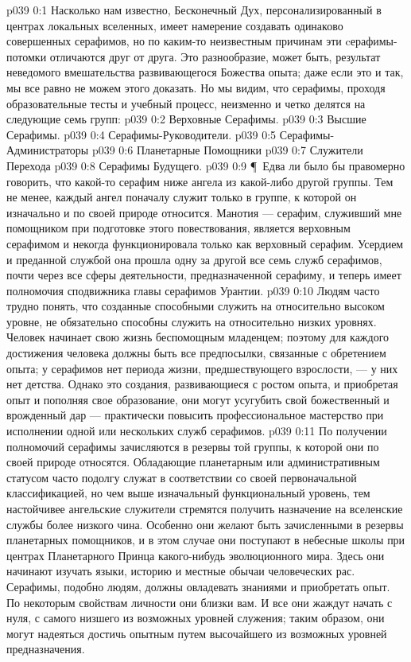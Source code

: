 \author{Мелхиседек}
\vs p039 0:1 Насколько нам известно, Бесконечный Дух, персонализированный в центрах локальных вселенных, имеет намерение создавать одинаково совершенных серафимов, но по каким\hyp{}то неизвестным причинам эти cерафимы\hyp{}потомки отличаются друг от друга. Это разнообразие, может быть, результат неведомого вмешательства развивающегося Божества опыта; даже если это и так, мы все равно не можем этого доказать. Но мы видим, что серафимы, проходя образовательные тесты и учебный процесс, неизменно и четко делятся на следующие семь групп:
\vs p039 0:2 \bibnobreakspace Верховные Серафимы.
\vs p039 0:3 \bibnobreakspace Высшие Серафимы.
\vs p039 0:4 \bibnobreakspace Серафимы\hyp{}Руководители.
\vs p039 0:5 \bibnobreakspace Серафимы\hyp{}Администраторы
\vs p039 0:6 \bibnobreakspace Планетарные Помощники
\vs p039 0:7 \bibnobreakspace Служители Перехода
\vs p039 0:8 \bibnobreakspace Серафимы Будущего.
\vs p039 0:9 \P\ Едва ли было бы правомерно говорить, что какой\hyp{}то серафим ниже ангела из какой\hyp{}либо другой группы. Тем не менее, каждый ангел поначалу служит только в группе, к которой он изначально и по своей природе относится. Манотия --- серафим, служивший мне помощником при подготовке этого повествования, является верховным серафимом и некогда функционировала только как верховный серафим. Усердием и преданной службой она прошла одну за другой все семь служб серафимов, почти через все сферы деятельности, предназначенной серафиму, и теперь имеет полномочия сподвижника главы серафимов Урантии.
\vs p039 0:10 Людям часто трудно понять, что созданные способными служить на относительно высоком уровне, не обязательно способны служить на относительно низких уровнях. Человек начинает свою жизнь беспомощным младенцем; поэтому для каждого достижения человека должны быть все предпосылки, связанные с обретением опыта; у серафимов нет периода жизни, предшествующего взрослости, --- у них нет детства. Однако это создания, развивающиеся с ростом опыта, и приобретая опыт и пополняя свое образование, они могут усугубить свой божественный и врожденный дар --- практически повысить профессиональное мастерство при исполнении одной или нескольких служб серафимов.
\vs p039 0:11 По получении полномочий серафимы зачисляются в резервы той группы, к которой они по своей природе относятся. Обладающие планетарным или административным статусом часто подолгу служат в соответствии со своей первоначальной классификацией, но чем выше изначальный функциональный уровень, тем настойчивее ангельские служители стремятся получить назначение на вселенские службы более низкого чина. Особенно они желают быть зачисленными в резервы планетарных помощников, и в этом случае они поступают в небесные школы при центрах Планетарного Принца какого\hyp{}нибудь эволюционного мира. Здесь они начинают изучать языки, историю и местные обычаи человеческих рас. Серафимы, подобно людям, должны овладевать знаниями и приобретать опыт. По некоторым свойствам личности они близки вам. И все они жаждут начать с нуля, с самого низшего из возможных уровней служения; таким образом, они могут надеяться достичь опытным путем высочайшего из возможных уровней предназначения.
